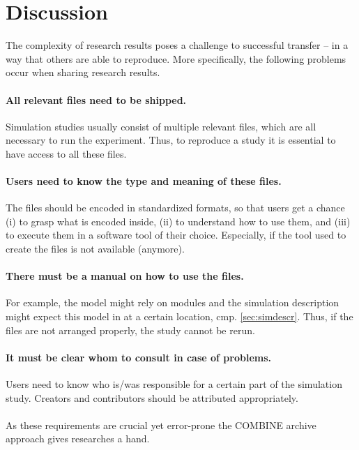 

\section{Discussion}
The complexity of research results poses a  challenge to successful  transfer --  in a way  that others are able to reproduce.
More specifically, the following problems occur when sharing research results.

\paragraph{All relevant files need to be shipped.}
Simulation studies usually consist of multiple relevant files, which are all necessary to run the experiment.
Thus, to reproduce a study it is essential to have access to all these files.
\paragraph{Users need to know the type and meaning of these files.}
The files should be encoded in standardized formats, so that users get a chance (i) to grasp what is encoded inside, (ii) to understand how to use them, and (iii) to execute them in a software tool of their choice.
Especially, if the tool used to create the files is not available (anymore).
\paragraph{There must be a manual on how to use the files.}
For example, the model might rely on modules and the simulation description might expect this model in at a certain location, cmp. \ref{sec:simdescr}.
Thus, if the files are not arranged properly, the study cannot be rerun.
\paragraph{It must be clear whom to consult in case of problems.}
Users need to know who is/was responsible for a certain part of the simulation study.
Creators and contributors should be attributed appropriately.
\paragraph{}
As these requirements are crucial yet error-prone the COMBINE archive approach gives researches a hand.

